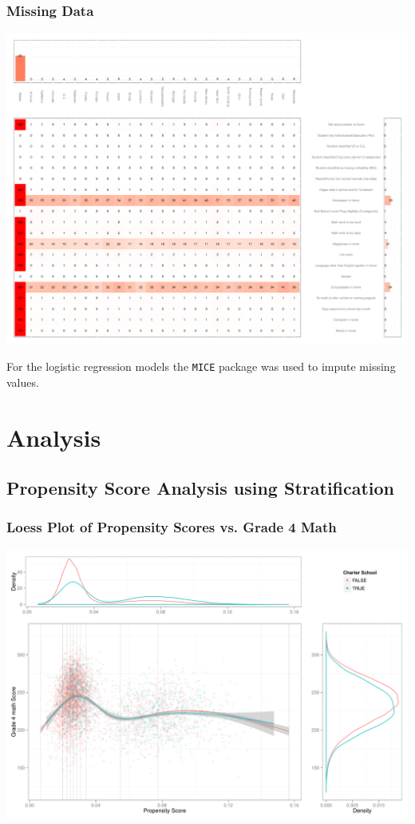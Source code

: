 \documentclass[10pt,handout,mathserif]{beamer}
\begin{document}
\begin{frame}[c]
	\frametitle{Missing Data}
	\begin{center}
	\includegraphics[height=.70\paperheight,keepaspectratio=true]{../Figures2009/g4math-missing.pdf} \\
	\end{center}
	For the logistic regression models the \texttt{MICE} \cite{mice} package was used to impute missing values.
\end{frame}

\section{Analysis}

\subsection{Propensity Score Analysis using Stratification}

\begin{frame}[c]
	\frametitle{Loess Plot of Propensity Scores vs. Grade 4 Math}
	\begin{center}
	\includegraphics[width=0.9\paperwidth,keepaspectratio]{../Figures2009/g4math-loess}
	\end{center}
\end{frame}
\end{document}
